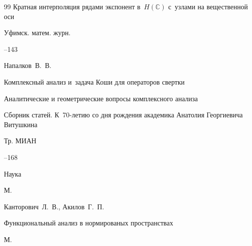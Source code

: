 \begin{thebibliography}{99}
\paper Кратная интерполяция рядами экспонент в~$H(\mathbb C)$ с~узлами на вещественной оси

\jour Уфимск. матем. журн.




--143












\by Напалков~В.~В.

\paper Комплексный анализ и~задача Коши для операторов свертки

\inbook Аналитические и геометрические вопросы комплексного анализа

\bookinfo Сборник статей. К~70-летию со дня рождения академика Анатолия Георгиевича Витушкина

\serial Тр. МИАН



--168

\publ Наука

\publaddr М.












\by Канторович~Л.~В., Акилов~Г.~П.

\book Функциональный анализ в нормированых пространствах

\publaddr М.


\end{thebibliography}

